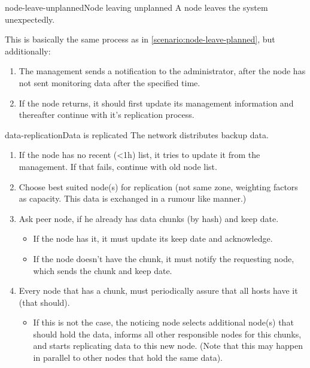 \begin{scenario}{node-leave-unplanned}{Node leaving unplanned}
    A node leaves the system unexpectedly.

	This is basically the same process as in \ref{scenario:node-leave-planned}, but additionally:
	\begin{enumerate}
		\item The management sends a notification to the administrator, after the node has not sent monitoring data after the specified time.
		\item If the node returns, it should first update its management information and thereafter continue with it's replication process.
	\end{enumerate}
\end{scenario}

\begin{scenario}{data-replication}{Data is replicated}
	The network distributes backup data.
   	\begin{enumerate}
   		\item If the node has no recent (<1h) list, it tries to update it from the management. If that fails, continue with old node list.
   		\item Choose best suited node(s) for replication (not same zone, weighting factors as capacity. This data is exchanged in a rumour like manner.)
   		\item Ask peer node, if he already has data chunks (by hash) and keep date.
   		\begin{itemize} %
   				\item If the node has it, it must update its keep date and acknowledge.
   				\item If the node doesn't have the chunk, it must notify the requesting node, which sends the chunk and keep date.
   			\end{itemize}
   		\item Every node that has a chunk, must periodically assure that all hosts have it (that should).
   			\begin{itemize}
	   			\item If this is not the case, the noticing node selects additional node(s) that should hold the data, informs all other responsible nodes for this chunks, and starts replicating data to this new node. (Note that this may happen in parallel to other nodes that hold the same data).
	   		\end{itemize}
   	\end{enumerate}    
        

\end{scenario}
